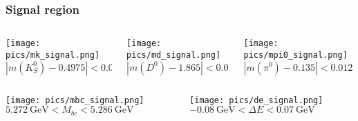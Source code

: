 \documentclass[10 pt,compress,mathserif]{beamer}
\begin{document}
\begin{frame}
 \frametitle{Signal region}
 \begin{small}
 \begin{columns}
  \begin{column}{0.33\textwidth}
  \begin{center}
   \texttt{[image: pics/mk\_signal.png]}\\
   $\left|m(K_S^0)-0.4975\right|<0.009\ \text{GeV}$\\
  \end{center}
  \end{column}
  \begin{column}{0.33\textwidth}
  \begin{center}
   \texttt{[image: pics/md\_signal.png]}\\
   $\left|m(D^0)-1.865\right|<0.013\ \text{GeV}$
  \end{center}
  \end{column}
  \begin{column}{0.33\textwidth}
   \begin{center}
    \texttt{[image: pics/mpi0\_signal.png]}\\
   $\left|m(\pi^0)-0.135\right|<0.012\ \text{GeV}$\\
   \end{center}
  \end{column}
 \end{columns}
 \begin{columns}
  \begin{column}{0.5\textwidth}
  \begin{center}
   \texttt{[image: pics/mbc\_signal.png]}\\
   $5.272\ \text{GeV}<M_{bc}<5.286\ \text{GeV}$\\
  \end{center}
  \end{column}
  \begin{column}{0.5\textwidth}
  \begin{center}
   \texttt{[image: pics/de\_signal.png]}\\
   $-0.08\ \text{GeV}<\Delta E<0.07\ \text{GeV}$\\
  \end{center}
  \end{column}
 \end{columns}

 \end{small}
\end{frame}
\end{document}
